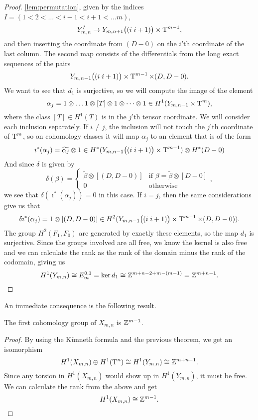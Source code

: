\begin{proof}
  \ref{lem:permutation}, given by the indices $I = (1 < 2 < \dots <
  i-1 < i+1 < \dots m)$,
  \[ Y_{m,n}^I \to Y_{m,n+1}\big((i \; i+1)\big) \times \operatorname{T}^{m-1}, \]
  and then inserting the coordinate from $(D-0)$ on the $i$'th
  coordinate of the last column. 
  The second map consists of the differentials from the long exact
  sequences of the pairs
  \[ Y_{m,n-1}\big((i\; i+1)\big) \times \operatorname{T}^{m-1}\times (D,D-0). \]
  We want to see that $d_1$ is surjective, so we will compute the
  image of the element 
  \[ \alpha_j = 1\otimes\dots 1\otimes [T] \otimes 1 \otimes \dots
  \otimes 1 \in H^1(Y_{m,n-1}\times \operatorname{T}^{m}),\] 
  where the class $[T]\in H^1(T)$ is in the $j$'th tensor coordinate.
  We will consider each inclusion separately. If $i \neq j$, the
  inclusion will not touch the $j$'th coordinate of $\operatorname{T}^m$, so on
  cohomology classes it will map $\alpha_j$ to an element that is of
  the form
  \[ \imath^*(\alpha_j) = \widetilde{\alpha_j}\otimes 1 \in
  H^*(Y_{m,n-1}\big((i\; i+1) \big) \times \operatorname{T}^{m-1}) \otimes
  H^*(D-0) \]
  And since $\delta$ is given by 
  \[ \delta(\beta) =
  \begin{cases}
    \widetilde{\beta}\otimes [(D,D-0)] & \text{if } \beta =
    \widetilde{\beta}\otimes [D-0] \\
    0 & \text{otherwise}
  \end{cases}, \]
  we see that $\delta(\imath^*(\alpha_j)) = 0$ in this case. If $i =
  j$, then the same considerations give us that
  \[ \delta\imath^*(\alpha_j) = 1 \otimes [(D,D-0)] \in
  H^2(Y_{m,n-1}\big((i\; i+1) \big) \times \operatorname{T}^{m-1}\times (D,D-0)). \]
  The group $H^2(F_1,F_0)$ are generated by exactly these elements, so
  the map $d_1$ is surjective. Since the groups involved are all free,
  we know the kernel is also free and we can calculate the rank as the
  rank of the domain minus the rank of the codomain, giving us
  \[ H^1(Y_{m,n}) \cong E_{\infty}^{0,1} = \ker d_1 \cong
  \mathbb{Z}^{m+n-2+m-(m-1)} = \mathbb{Z}^{m+n-1}. \]
\end{proof}

An immediate consequence is the following result.

\begin{corollary}
  The first cohomology group of $X_{m,n}$ is $\mathbb{Z}^{m-1}$.
\end{corollary}
\begin{proof}
  By using the Künneth formula and the previous theorem, we get an
  isomorphism 
  \[ H^1(X_{m,n}) \oplus H^1(\operatorname{T}^n) \cong  H^1(Y_{m,n}) \cong
  \mathbb{Z}^{m+n-1}. \]
  Since any torsion in $H^1(X_{m,n})$ would show up in $H^1(Y_{m,n})$,
  it must be free. We can calculate the rank from the above and get
  \[ H^1(X_{m,n}) \cong \mathbb{Z}^{m-1}. \]
\end{proof}

